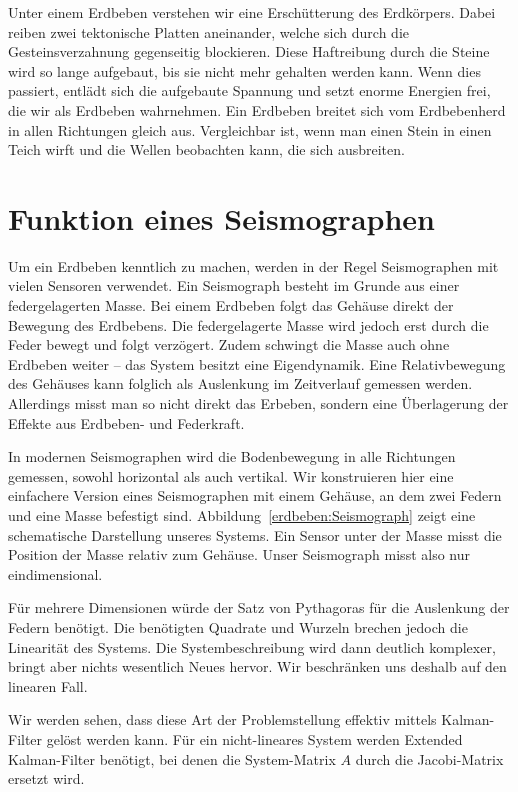 %
%

\noindent
Unter einem Erdbeben verstehen wir eine Erschütterung des Erdkörpers.
Dabei reiben zwei tektonische Platten aneinander, welche sich durch die Gesteinsverzahnung gegenseitig blockieren.
Diese Haftreibung durch die Steine wird so lange aufgebaut, bis sie nicht mehr gehalten werden kann.
Wenn dies passiert, entlädt sich die aufgebaute Spannung und setzt enorme Energien frei, die wir als Erdbeben wahrnehmen.
Ein Erdbeben breitet sich vom Erdbebenherd in allen Richtungen gleich aus.
Vergleichbar ist, wenn man einen Stein in einen Teich wirft und die Wellen beobachten kann, die sich ausbreiten.

\section{Funktion eines Seismographen}
Um ein Erdbeben kenntlich zu machen, werden in der Regel Seismographen mit vielen Sensoren verwendet. 
Ein Seismograph besteht im Grunde aus einer federgelagerten Masse.
Bei einem Erdbeben folgt das Gehäuse direkt der Bewegung des Erdbebens.
Die federgelagerte Masse wird jedoch erst durch die Feder bewegt und folgt verzögert.
Zudem schwingt die Masse auch ohne Erdbeben weiter -- das System besitzt eine Eigendynamik.
Eine Relativbewegung des Gehäuses kann folglich als Auslenkung im Zeitverlauf gemessen werden.
Allerdings misst man so nicht direkt das Erbeben, sondern eine Überlagerung der Effekte aus Erdbeben- und Federkraft.

In modernen Seismographen wird die Bodenbewegung in alle Richtungen gemessen,
sowohl horizontal als auch vertikal. 
Wir konstruieren hier eine einfachere Version eines Seismographen mit einem Gehäuse,
an dem zwei Federn und eine Masse befestigt sind. 
Abbildung~\ref{erdbeben:Seismograph} zeigt eine schematische Darstellung unseres Systems.
Ein Sensor unter der Masse misst die Position der Masse relativ zum Gehäuse.
Unser Seismograph misst also nur eindimensional.

Für mehrere Dimensionen würde der Satz von Pythagoras für die Auslenkung der Federn benötigt.
Die benötigten Quadrate und Wurzeln brechen jedoch die Linearität des Systems.
Die Systembeschreibung wird dann deutlich komplexer, bringt aber nichts wesentlich Neues hervor.
Wir beschränken uns deshalb auf den linearen Fall.

Wir werden sehen, dass diese Art der Problemstellung effektiv mittels Kalman-Filter gelöst werden kann.
Für ein nicht-lineares System werden Extended Kalman-Filter benötigt,
bei denen die System-Matrix $A$ durch die Jacobi-Matrix ersetzt wird.

